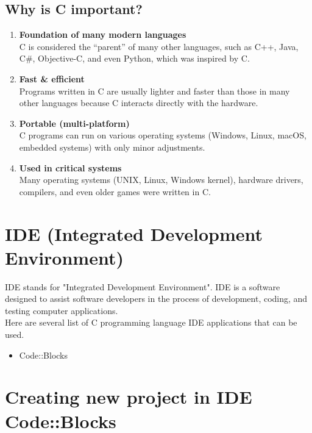 \subsection*{Why is C important?}
\begin{enumerate}
    \item \textbf{Foundation of many modern languages} \\
    C is considered the ``parent'' of many other languages, such as C++, Java, C\#, Objective-C, and even Python, which was inspired by C.

    \item \textbf{Fast \& efficient} \\
    Programs written in C are usually lighter and faster than those in many other languages because C interacts directly with the hardware.

    \item \textbf{Portable (multi-platform)} \\
    C programs can run on various operating systems (Windows, Linux, macOS, embedded systems) with only minor adjustments.

    \item \textbf{Used in critical systems} \\
    Many operating systems (UNIX, Linux, Windows kernel), hardware drivers, compilers, and even older games were written in C.
\end{enumerate}


\section*{IDE (Integrated Development Environment)}
IDE stands for "Integrated Development Environment". IDE is a software designed to assist software developers in the process of development, coding, and testing computer applications.
\\
Here are several list of C programming language IDE applications that can be used.
\begin{itemize}
	\item Code::Blocks
\end{itemize}
\section*{Creating new project in IDE Code::Blocks}
